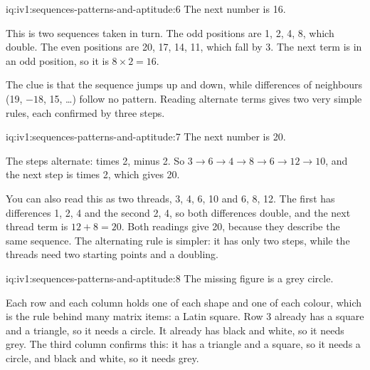 \begin{solution}{iq:iv1:sequences-patterns-and-aptitude:6}
The next number is 16.

This is two sequences taken in turn. The odd positions are 1, 2, 4, 8, which double. The even positions are 20, 17, 14, 11, which fall by 3. The next term is in an odd position, so it is $8 \times 2 = 16$.

The clue is that the sequence jumps up and down, while differences of neighbours (19, $-18$, 15, \dots) follow no pattern. Reading alternate terms gives two very simple rules, each confirmed by three steps.

\end{solution}

\begin{solution}{iq:iv1:sequences-patterns-and-aptitude:7}
The next number is 20.

The steps alternate: times 2, minus 2. So $3 \to 6 \to 4 \to 8 \to 6 \to 12 \to 10$, and the next step is times 2, which gives 20.

You can also read this as two threads, 3, 4, 6, 10 and 6, 8, 12. The first has differences 1, 2, 4 and the second 2, 4, so both differences double, and the next thread term is $12 + 8 = 20$. Both readings give 20, because they describe the same sequence. The alternating rule is simpler: it has only two steps, while the threads need two starting points and a doubling.

\end{solution}

\begin{solution}{iq:iv1:sequences-patterns-and-aptitude:8}
The missing figure is a grey circle.

Each row and each column holds one of each shape and one of each colour, which is the rule behind many matrix items: a Latin square. Row 3 already has a square and a triangle, so it needs a circle. It already has black and white, so it needs grey. The third column confirms this: it has a triangle and a square, so it needs a circle, and black and white, so it needs grey.

\end{solution}

